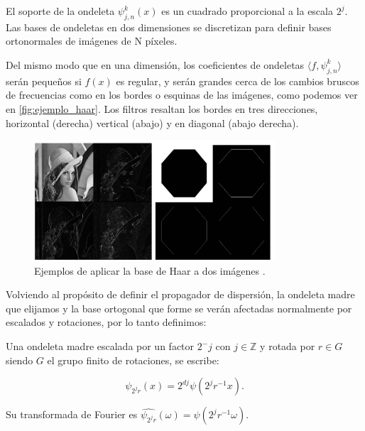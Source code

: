 \medskip

\noindent El soporte de la ondeleta $\psi_{j,n}^k(x)$ es un cuadrado proporcional a la escala $2^j$. Las bases de ondeletas en dos dimensiones se discretizan para definir bases ortonormales de imágenes de N píxeles.


\noindent Del mismo modo que en una dimensión, los coeficientes de ondeletas $\langle f,\psi_{j,n}^k \rangle$ serán pequeños si $f(x)$ es regular, y serán grandes cerca de los cambios bruscos de frecuencias como en los bordes o esquinas de las imágenes, como podemos ver en \autoref{fig:ejemplo_haar}. Los filtros resaltan los bordes en tres direcciones, horizontal (derecha) vertical (abajo) y en diagonal (abajo derecha).

\begin{figure} [!h]
  \centering
  \includegraphics[width=0.8\textwidth]{img/ejemplos_haar_basis.png}
  \caption{Ejemplos de aplicar la base de Haar a dos imágenes \cite{HaarBasis}.}
  \label{fig:ejemplo_haar}
\end{figure}

\medskip 

\noindent Volviendo al propósito de definir el propagador de dispersión, la ondeleta madre que elijamos y la base ortogonal que forme se verán afectadas normalmente por escalados y rotaciones, por lo tanto definimos: 

\begin{definicion}
  Una ondeleta madre escalada por un factor $2^-j$ con $j \in \mathbb{Z}$ y rotada por $r \in G$ siendo $G$ el grupo finito de rotaciones, se escribe: 

  $$\psi_{2^j r}(x)=2^{dj} \psi(2^j r^{-1} x).$$
\end{definicion}


\medskip

\noindent Su transformada de Fourier es $\widehat{\psi_{2^j r}}(\omega)=\widehat{\psi}(2^j r^{-1} \omega)$.

\medskip

